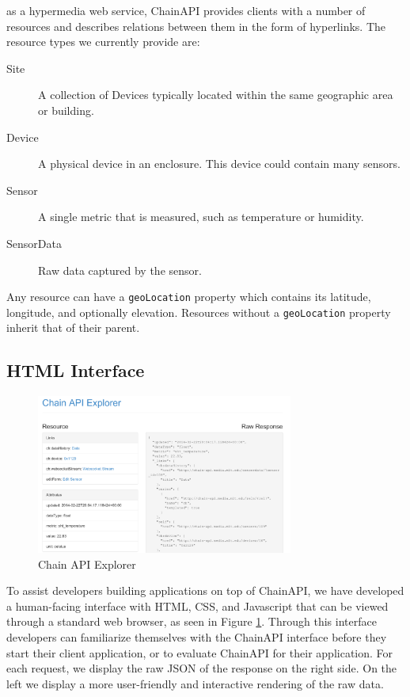 \documentclass{acm_proc_article-sp}
\begin{document}
as a hypermedia web service, ChainAPI provides clients with a number of
resources and describes relations between them in the form of hyperlinks.  The
resource types we currently provide are:

\begin{description}
    \item[Site] A collection of Devices typically located within the same
        geographic area or building.
    \item[Device] A physical device in an enclosure. This device could contain
        many sensors.
    \item[Sensor] A single metric that is measured, such as temperature or humidity.
    \item[SensorData] Raw data captured by the sensor.
\end{description}

Any resource can have a \texttt{geoLocation} property which contains its
latitude, longitude, and optionally elevation. Resources without a
\texttt{geoLocation} property inherit that of their parent.

\subsection{HTML Interface}

\begin{figure}
    \centering
    \includegraphics[width=8.45cm, frame]{chain_explorer2}
    \caption{Chain API Explorer}
    \label{chain_explorer}
\end{figure}

To assist developers building applications on top of ChainAPI, we have
developed a human-facing interface with HTML, CSS, and Javascript that can be
viewed through a standard web browser, as seen in Figure \ref{chain_explorer}.
Through this interface developers can familiarize themselves with the ChainAPI
interface before they start their client application, or to evaluate ChainAPI
for their application. For each request, we display the raw JSON of the
response on the right side. On the left we display a more user-friendly and
interactive rendering of the raw data.
\end{document}
